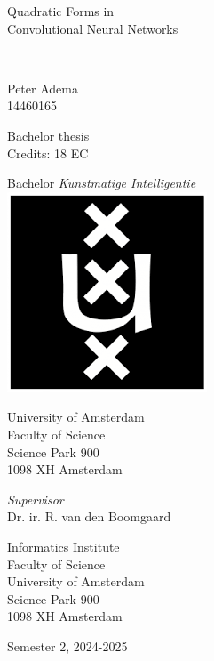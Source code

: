 \documentclass[a4paper, 12pt]{report}
\newcommand{\theTitle}{Quadratic Forms in \\
\vspace{0.5em}
Convolutional Neural Networks}
\newcommand{\theSubTitle}{}
\newcommand{\theAuthor}{Peter Adema}
\newcommand{\theStudentID}{14460165}
\newcommand{\theSupervisor}{Dr. ir. R. van den Boomgaard} %
\newcommand{\theInstitute}{
Informatics Institute \\ %
Faculty of Science\\
University of Amsterdam\\
Science Park 900 \\ 
1098 XH Amsterdam 
}
\newcommand{\theDate}{Semester 2, 2024-2025}
\begin{document}
\pagestyle{empty}
\begin{center}

\vspace{2.5cm}


\begin{Huge}
\theTitle
\end{Huge} \\

\vspace{0.5 cm}

\begin{Large}
\theSubTitle
\end{Large}

\vspace{1.5cm}

\theAuthor\\
\theStudentID

\vspace{1.5cm}

Bachelor thesis\\
Credits: 18 EC

\vspace{0.5cm}

Bachelor \textit{Kunstmatige Intelligentie} \\
\vspace{0.25cm}
\includegraphics[width=0.075\paperwidth]{figures/uva_logo} \\
\vspace{0.1cm}

University of Amsterdam\\
Faculty of Science\\
Science Park 900\\
1098 XH Amsterdam

\vspace{2cm}

\emph{Supervisor}\\

\theSupervisor

\vspace{0.25cm}

\theInstitute

\vspace{1.0cm}

\theDate

\end{center}
\end{document}
